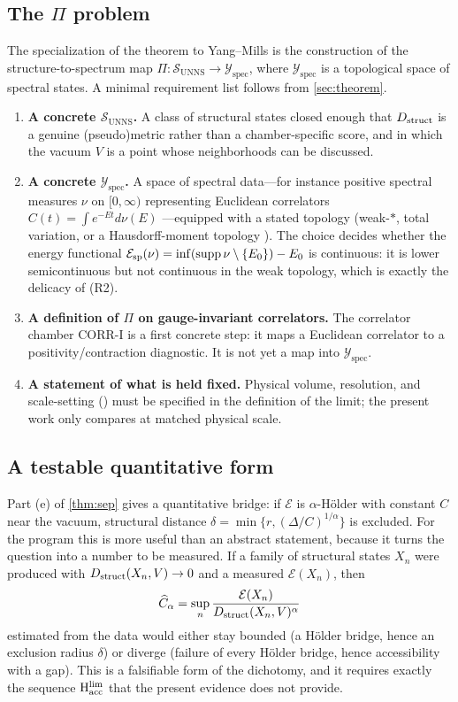 \documentclass[11pt,a4paper]{article}
\theoremstyle{definition}
\theoremstyle{remark}
\newcommand{\SUNNS}{\mathcal{S}_{\mathrm{UNNS}}}
\newcommand{\Yspec}{\mathcal{Y}_{\mathrm{spec}}}
\newcommand{\Hacc}{\mathrm{H}_{\mathrm{acc}}}
\begin{document}
\subsection{The \texorpdfstring{$\Pi$}{Pi} problem}\label{ssec:pi}
The specialization of the theorem to Yang--Mills is the construction of the structure-to-spectrum map $\Pi:\SUNNS\to\Yspec$, where $\Yspec$ is a topological space of spectral states. A minimal requirement list follows from \cref{sec:theorem}.

\begin{enumerate}[label=(P\arabic*)]
\item \textbf{A concrete $\SUNNS$.} A class of structural states closed enough that $D_{\rm struct}$ is a genuine (pseudo)metric rather than a chamber-specific score, and in which the vacuum $V$ is a point whose neighborhoods can be discussed.
\item \textbf{A concrete $\Yspec$.} A space of spectral data---for instance positive spectral measures $\nu$ on $[0,\infty)$ representing Euclidean correlators $C(t)=\int e^{-Et}d\nu(E)$ \cite{OS73,OS75,GlimmJaffe}---equipped with a stated topology (weak-$*$, total variation, or a Hausdorff-moment topology \cite{ShohatTamarkin,Akhiezer}). The choice decides whether the energy functional $\mathcal E_{\rm sp}(\nu)=\inf(\mathrm{supp}\,\nu\setminus\{E_0\})-E_0$ is continuous: it is lower semicontinuous but not continuous in the weak topology, which is exactly the delicacy of (R2).
\item \textbf{A definition of $\Pi$ on gauge-invariant correlators.} The correlator chamber CORR-I is a first concrete step: it maps a Euclidean correlator to a positivity/contraction diagnostic. It is not yet a map into $\Yspec$.
\item \textbf{A statement of what is held fixed.} Physical volume, resolution, and scale-setting (\cite{Sommer94,LuscherWolff90}) must be specified in the definition of the limit; the present work only compares at matched physical scale.
\end{enumerate}

\subsection{A testable quantitative form}\label{ssec:holder}
Part (e) of \cref{thm:sep} gives a quantitative bridge: if $\mathcal E$ is $\alpha$-H\"older with constant $C$ near the vacuum, structural distance $\delta=\min\{r,(\Delta/C)^{1/\alpha}\}$ is excluded. For the program this is more useful than an abstract statement, because it turns the question into a number to be measured. If a family of structural states $X_n$ were produced with $D_{\rm struct}(X_n,V)\to0$ and a measured $\mathcal E(X_n)$, then
\[
\widehat C_\alpha=\sup_n \frac{\mathcal E(X_n)}{D_{\rm struct}(X_n,V)^{\alpha}}
\]
estimated from the data would either stay bounded (a H\"older bridge, hence an exclusion radius $\delta$) or diverge (failure of every H\"older bridge, hence accessibility with a gap). This is a falsifiable form of the dichotomy, and it requires exactly the sequence $\Hacc^{\rm lim}$ that the present evidence does not provide.
\end{document}
